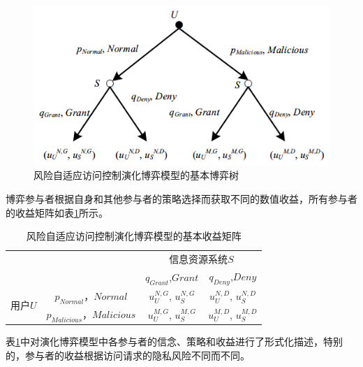 \begin{figure}[htbp]
	\centering
	\includegraphics[width = 0.6\linewidth]{./figures/game-tree.png}
	\caption{风险自适应访问控制演化博弈模型的基本博弈树}
	\label{fig:game-tree}
\end{figure}

博弈参与者根据自身和其他参与者的策略选择而获取不同的数值收益，所有参与者的收益矩阵如表\ref{tab:privacy-utilities-matrix}所示。

\begin{table}[htbp]
	\caption{风险自适应访问控制演化博弈模型的基本收益矩阵}
	\label{tab:privacy-utilities-matrix}
	\centering
	\begin{tabular}{cccc}%
		
		\toprule
		\textbf{ }&\textbf{ }&\multicolumn{2}{c}{信息资源系统$S$}\\
		\textbf{ }&\textbf{ }& $q_{Grant}$,$Grant$&$q_{Deny}$,$Deny$\\
		\midrule
		\multirow{2}{*}{用户$U$} & $p_{Normal}$，$Normal$ &$u_U^{N,G}$, $u_S^{N,G}$ & $u_U^{N,D}$, $u_S^{N,D}$\\
		& $p_{Malicious}$，$Malicious$ &$u_U^{M,G}$, $u_S^{M,G}$ & $u_U^{M,D}$, $u_S^{M,D}$\\
		\bottomrule
	\end{tabular}
\end{table}

表\ref{tab:privacy-utilities-matrix}中对演化博弈模型中各参与者的信念、策略和收益进行了形式化描述，特别的，参与者的收益根据访问请求的隐私风险不同而不同。


